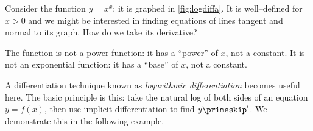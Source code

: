 
Consider the function $y=x^x$; it is graphed in \autoref{fig:logdiffa}. It is well--defined for $x>0$ and we might be interested in finding equations of lines tangent and normal to its graph. How do we take its derivative?

The function is not a power function: it has a ``power'' of $x$, not a constant. It is not an exponential function: it has a ``base'' of $x$, not a constant. 

A differentiation technique known as \emph{logarithmic differentiation} becomes useful here. The basic principle is this: take the natural log of both sides of an equation $y=f(x)$, then use implicit differentiation to find $y\primeskip'$. We demonstrate this in the following example.

